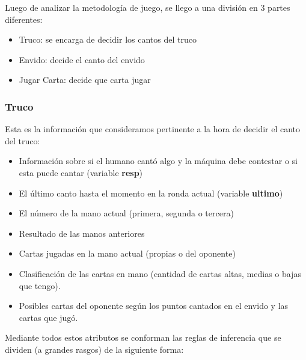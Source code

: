 \documentclass[12pt,a4paper]{article}
\begin{document}

Luego de analizar la metodolog\'ia de juego, se llego a una divisi\'on en 3 partes diferentes:
\begin{itemize}
\item Truco: se encarga de decidir los cantos del truco
\item Envido: decide el canto del envido
\item Jugar Carta: decide que carta jugar
\end{itemize}
 

\subsubsection{Truco}
Esta es la informaci\'on que consideramos pertinente a la hora de decidir el canto del truco:
\begin{itemize}
\item Informaci\'on sobre si el humano cant\'o algo y la m\'aquina debe contestar o si esta puede cantar (variable \textbf{resp})
\item El \'ultimo canto hasta el momento en la ronda actual (variable \textbf{ultimo})
\item El n\'umero de la mano actual (primera, segunda o tercera)
\item Resultado de las manos anteriores
\item Cartas jugadas en la mano actual (propias o del oponente)
\item Clasificaci\'on de las cartas en mano (cantidad de cartas altas, medias o bajas que tengo).
\item Posibles cartas del oponente seg\'un los puntos cantados en el envido y las cartas que jug\'o.
\end{itemize}

Mediante todos estos atributos se conforman las reglas de inferencia que se dividen (a grandes rasgos) de la 
siguiente forma:
\end{document}
